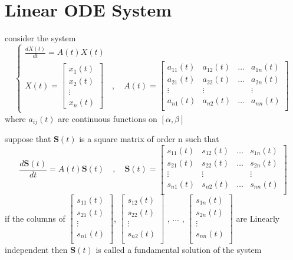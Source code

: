 \documentclass[]{article}
\begin{document}
\section{Linear ODE System}
consider the system
\begin{equation}
    \begin{cases}
        \displaystyle \frac{dX(t)}{dt} = A(t)X(t)
        \\
        \displaystyle X(t) = \begin{bmatrix}
            x_{1}(t)\\
            x_{2}(t)\\
            \vdots\\
            x_{n}(t)
        \end{bmatrix}
        \quad , \quad
        A(t) = \begin{bmatrix}
            a_{11}(t) & a_{12}(t) & \dots & a_{1n}(t)\\
            a_{21}(t) & a_{22}(t) & \dots & a_{2n}(t)\\
            \vdots &\vdots & &\vdots \\
            a_{n1}(t) & a_{n2}(t) & \dots & a_{nn}(t)\\
        \end{bmatrix}        
    \end{cases}
\end{equation}
where $a_{ij}(t)$ are continuous functions on $[\alpha , \beta]$

suppose that $\mathbf{S}(t)$ is a square matrix of order n such that 
\[
    \frac{d\mathbf{S}(t)}{dt} = A(t)\mathbf{S}(t)
    \quad , \quad 
    \mathbf{S}(t) = \begin{bmatrix}
        s_{11}(t) & s_{12}(t) & \dots & s_{1n}(t)\\
        s_{21}(t) & s_{22}(t) & \dots & s_{2n}(t)\\
        \vdots &\vdots & &\vdots \\
        s_{n1}(t) & s_{n2}(t) & \dots & s_{nn}(t)\\
    \end{bmatrix}
\]
if the columns of 
$
\begin{bmatrix}
    s_{11}(t)\\
    s_{21}(t)\\
    \vdots\\
    s_{n1}(t)\\
\end{bmatrix}
$,
$
\begin{bmatrix}
    s_{12}(t)\\
    s_{22}(t)\\
    \vdots\\
    s_{n2}(t)\\
\end{bmatrix}
$
,
$\dots$
,
$
\begin{bmatrix}
    s_{1n}(t)\\
    s_{2n}(t)\\
    \vdots\\
    s_{nn}(t)\\
\end{bmatrix}
$
are Linearly independent then $\mathbf{S}(t)$ is called a fundamental solution
of the system
\end{document}
